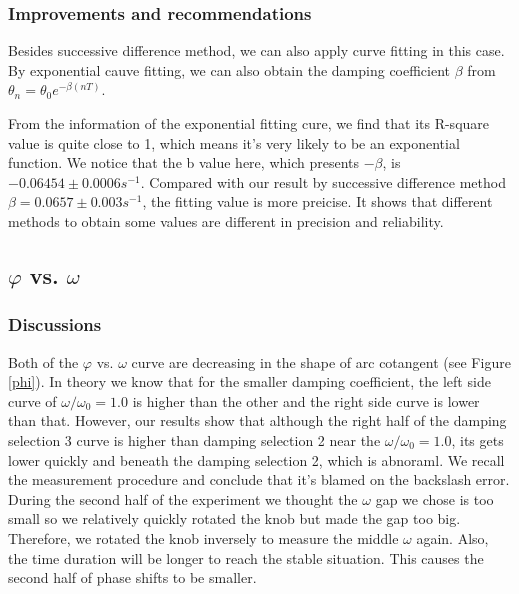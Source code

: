 \subsubsection{Improvements and recommendations}

Besides successive difference method, we can also apply curve fitting in this
case. By exponential cauve fitting, we can also obtain the damping coefficient
$\beta$ from $\theta_n=\theta_0e^{-\beta (nT)}$. 
	

From the information of the exponential fitting cure, we find that its R-square
value is quite close to 1, which means it's very likely to be an exponential
function. We notice that the b value here, which presents $-\beta$, is
$-0.06454\pm 0.0006s^{-1}$. Compared with our result by successive difference
method $\beta=0.0657\pm 0.003s^{-1}$, the fitting value is more preicise. It
shows that different methods to obtain some values are different in precision
and reliability. 
	


\subsection{$\varphi$ vs. $\omega$}

\subsubsection{Discussions}

Both of the $\varphi$ vs. $\omega$ curve are decreasing in the shape of arc
cotangent (see Figure \ref{phi}). In theory we know that for the smaller damping
coefficient, the left side curve of $\omega/\omega_0=1.0$ is higher than the
other and the right side curve is lower than that. However, our results show
that although the right half of the damping selection 3 curve is higher than
damping selection 2 near the $\omega/\omega_0=1.0$, its gets lower quickly and
beneath the damping selection 2, which is abnoraml. We recall the measurement
procedure and conclude that it's blamed on the backslash error. During the
second half of the experiment we thought the $\omega$ gap we chose is too small
so we relatively quickly rotated the knob but made the gap too big. Therefore,
we rotated the knob inversely to measure the middle $\omega$ again. Also, the
time duration will be longer to reach the stable situation. This causes the
second half of phase shifts to be smaller. 

